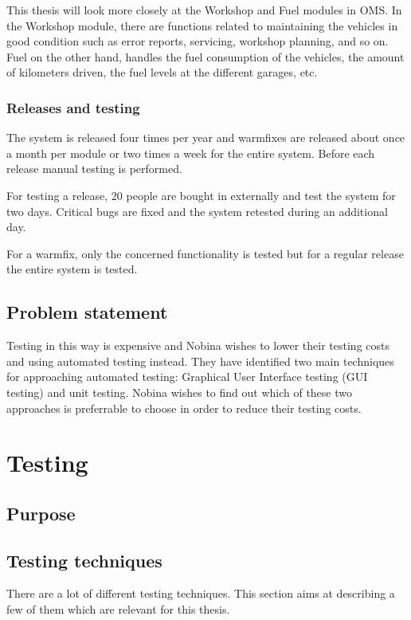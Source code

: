 \documentclass{article}
\begin{document}
		This thesis will look more closely at the Workshop and Fuel modules in OMS. In the Workshop module, there are functions related to maintaining the vehicles in good condition such as error reports, servicing, workshop planning, and so on. Fuel on the other hand, handles the fuel consumption of the vehicles, the amount of kilometers driven, the fuel levels at the different garages, etc.

		\subsubsection{Releases and testing} 
		The system is released four times per year and warmfixes are released about once a month per module or two times a week for the entire system. Before each release manual testing is performed. 

		For testing a release, 20 people are bought in externally and test the system for two days. Critical bugs are fixed and the system retested during an additional day.
		
		For a warmfix, only the concerned functionality is tested but for a regular release the entire system is tested.

	\subsection{Problem statement}
		Testing in this way is expensive and Nobina wishes to lower their testing costs and using automated testing instead. They have identified two main techniques for approaching automated testing: Graphical User Interface testing (GUI testing) and unit testing. Nobina wishes to find out which of these two approaches is preferrable to choose in order to reduce their testing costs.  

	\section{Testing}
		\subsection{Purpose}
		
		\subsection{Testing techniques}
		There are a lot of different testing techniques. This section aims at describing a few of them which are relevant for this thesis.
			
\end{document}
